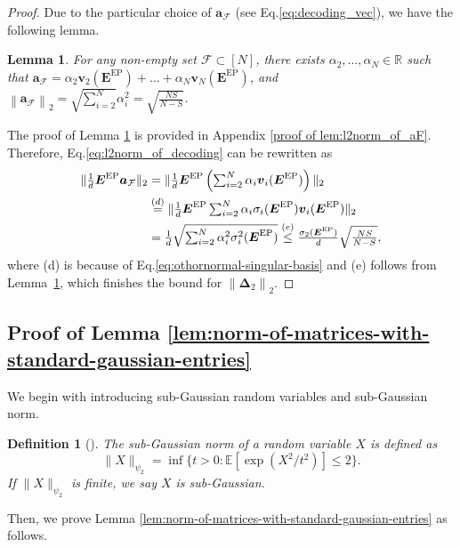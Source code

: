 \documentclass[lettersize,journal]{IEEEtran}
\renewcommand{\v}{\boldsymbol{v}}
\newcommand{\norm}[1]{\left\lVert#1\right\rVert}
\newcommand{\F}{\mathcal{F}}
\newcommand{\allones}[1]{\boldsymbol{J}_{#1}}
\newcommand{\GEP}{\boldsymbol{E}^{\mathrm{EP}}}
\newcommand{\gaussian}[2]{\mathcal{N}(#1, #2)}
\newcommand{\RR}{\mathbb{R}}
\newcommand{\ex}[1]{\mathbb{E}\left[#1\right]}
\newcommand{\psitwo}[1]{\|#1\|_{\psi_2} }
\renewcommand{\a}{\boldsymbol{a}}
\newtheorem{definition}{Definition}
\newtheorem{lemma}{Lemma}
\newtheorem{corollary}{Corollary}
\begin{document}
{\begin{proof}

Due to the particular choice of $\a_\F$ (see Eq.\eqref{eq:decoding_vec}), we have the following lemma.
\begin{lemma}
\label{lem:l2norm_of_aF}
    For any non-empty set $\F\subset[N]$, there exists $\alpha_2, \dots, \alpha_N\in \RR$ such that $\a_\F= \alpha_2\v_2(\GEP) + \dots+ \alpha_N \v_N(\GEP)$, and $\norm{\a_\F}_2 = \sqrt{\textstyle\sum_{i=2}^N}\alpha_i^2 = \sqrt{\tfrac{NS}{N-S}}$.
\end{lemma}
The proof of Lemma \ref{lem:l2norm_of_aF} is provided in Appendix \ref{proof of lem:l2norm_of_aF}.
Therefore, Eq.\eqref{eq:l2norm_of_decoding} can be rewritten as
\begin{align}
\|\tfrac{1}{d} \GEP \a_\F\|_2 &= \|\tfrac{1}{d}\GEP \left(\textstyle\sum_{i=2}^N \alpha_i\v_i(\GEP)\right)\|_2 \notag\\
    &\overset{(d)}{=} \|\tfrac{1}{d} \GEP \textstyle\sum_{i=2}^N \alpha_i \sigma_i(\GEP) \v_i(\GEP)\|_2\notag\\
    &=\tfrac{1}{d} \sqrt{\textstyle\sum_{i=2}^N \alpha_i^2\sigma_i^2(\GEP)}\overset{(e)}{\leq} \tfrac{\sigma_2(\GEP)}{d} \sqrt{\tfrac{NS}{N-S}}\notag,
\end{align}
where (d) is because of Eq.\eqref{eq:othornormal-singular-basis} and (e) follows from Lemma~\ref{lem:l2norm_of_aF}, which finishes the bound for $\norm{\boldsymbol{\Delta}_2}_2$. 
\end{proof}


\subsection{Proof of Lemma \ref{lem:norm-of-matrices-with-standard-gaussian-entries}}
We begin with introducing sub-Gaussian random variables and sub-Gaussian norm.
\begin{definition}[{\cite[Definition 2.5.6 \& Proposition 2.5.2]{vershynin2020high}}]
\label{def:sub-gaussian}
    The sub-Gaussian norm of a random variable $X$ is defined as
    \[
        \psitwo{X} = \inf\{ t > 0 : \ex{\exp(X^2 / t^2)} \leq 2 \}.
    \]
    If $\psitwo{X}$ is finite, we say $X$ is sub-Gaussian.
\end{definition}
Then, we prove Lemma \ref{lem:norm-of-matrices-with-standard-gaussian-entries} as follows.

}
\end{document}
